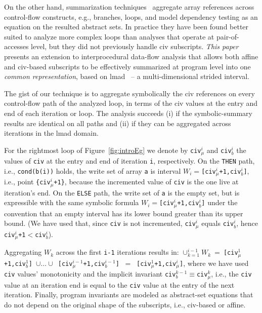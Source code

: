 \documentclass{sig-alternate}
\begin{document}
On the other hand, summarization techniques~\cite{SUIF,LMAD,CosPLDI} aggregate 
array references across control-flow constructs, e.g., branches, loops, and  
model dependency testing as an equation on the resulted abstract sets. 
In practice they have been found better suited to analyze more complex loops 
than analyses that operate at pair-of-accesses level, but they 
did not previously handle {\sc civ} subscripts.   
%
{\em This paper} presents an extension to interprocedural 
data-flow analysis that allows both affine and {\sc civ}-based subscripts 
to be effectively summarized at program level into one {\em common representation},
based on {\sc lmad}~\cite{LMAD} -- a multi-dimensional strided interval.

The gist of our technique is to aggregate symbolically the {\sc civ} 
references on every control-flow path of the analyzed loop, in terms
of the {\sc civ} values at the entry and end of each iteration or loop.
The analysis succeeds (i) if the symbolic-summary results are identical 
on all paths and (ii) if they can be aggregated across iterations %
in the {\sc lmad} domain. %

For the rightmost loop of Figure~\ref{fig:introEg} we denote by 
{\tt civ$_\mu^i$} and {\tt civ$_b^i$} the values of {\tt civ} 
at the entry and end of iteration {\tt i}, respectively.
%
On the {\tt THEN} path, i.e., {\tt cond(b(i))} holds, the write set 
of array {\tt a} is interval $W_i=${\tt [civ$_\mu^i$+1,civ$_b^i$]}, 
i.e., point {\tt \{civ$_\mu^i$+1\}}, because the incremented value 
of {\tt civ} is the one live at iteration's end. 
%
On the {\tt ELSE} path, the write set of {\tt a} is the empty set, 
but is expressible with the same symbolic formula 
$W_i=${\tt [civ$_\mu^i$+1,civ$_b^i$]} under the convention 
that an empty interval has its lower bound greater than its upper bound. 
(We have used that, since {\tt civ} is not incremented, {\tt civ$_\mu^i$} 
equals {\tt civ$_b^i$}, hence {\tt civ$_\mu^i$+1$ < $civ$_b^i$}).

Aggregating $W_k$ across the first {\tt i-1} iterations results in:
$\cup_{k=1}^{i-1}W_k \ = \ ${\tt [civ$_\mu^1$+1,civ$_b^1$]~$\cup\ldots\cup$~[civ$_\mu^{i-1}$+1,civ$_b^{i-1}$]} $\ = \ $ {\tt [civ$_\mu^1$+1,civ$_\mu^i$]}, where we have used {\tt civ} values'
monotonicity and the implicit invariant {\tt civ$_b^{k-1}\equiv$civ$_\mu^{k}$},
i.e., the {\tt civ} value at an iteration end is equal to the {\tt civ}
value at the entry of the next iteration. 
%
%
Finally, program invariants are modeled as abstract-set equations
that do not depend on the original shape of the subscripts, i.e., 
{\sc civ}-based or affine. 
\end{document}
